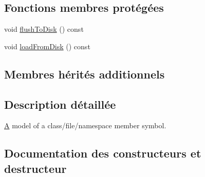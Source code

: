 \subsection*{Fonctions membres protégées}
\begin{DoxyCompactItemize}
\item 
void \hyperlink{class_member_def_a2b96429a74a8d626c843cc08292d985b}{flush\+To\+Disk} () const 
\item 
void \hyperlink{class_member_def_a46cd02a75cf8fa1e37779015b5b28fe1}{load\+From\+Disk} () const 
\end{DoxyCompactItemize}
\subsection*{Membres hérités additionnels}


\subsection{Description détaillée}
\hyperlink{class_a}{A} model of a class/file/namespace member symbol. 

\subsection{Documentation des constructeurs et destructeur}
\hypertarget{class_member_def_a3cda83ecd84802bf41b3d49f8252e62c}{}
